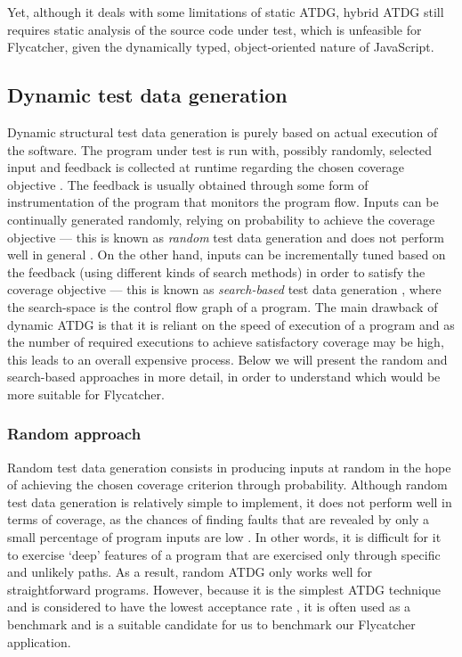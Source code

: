 \documentclass[a4paper,11pt,titlepage]{report}
\begin{document}
Yet, although it deals with some limitations of static ATDG, hybrid ATDG still requires static analysis of the source code under test, which is unfeasible for \textsf{Flycatcher}, given the dynamically typed, object-oriented nature of JavaScript.

\subsection{Dynamic test data generation}

Dynamic structural test data generation is purely based on actual execution of the software. The program under test is run with, possibly randomly, selected input and feedback is collected at runtime regarding the chosen coverage objective \cite{edvardsson1999survey}. The feedback is usually obtained through some form of instrumentation of the program that monitors the program flow. Inputs can be continually generated randomly, relying on probability to achieve the coverage objective --- this is known as \emph{random} test data generation and does not perform well in general \cite{edvardsson1999survey}. On the other hand, inputs can be incrementally tuned based on the feedback (using different kinds of search methods) in order to satisfy the coverage objective --- this is known as \emph{search-based} test data generation \cite{mcminn2004search}, where the search-space is the control flow graph of a program. The main drawback of dynamic ATDG is that it is reliant on the speed of execution of a program and as the number of required executions to achieve satisfactory coverage may be high, this leads to an overall expensive process. Below we will present the random and search-based approaches in more detail, in order to understand which would be more suitable for \textsf{Flycatcher}.

\subsubsection{Random approach}

Random test data generation consists in producing inputs at random in the hope of achieving the chosen coverage criterion through probability. Although random test data generation is relatively simple to implement, it does not perform well in terms of coverage, as the chances of finding faults that are revealed by only a small percentage of program inputs are low \cite{edvardsson1999survey}. In other words, it is difficult for it to exercise `deep' features of a program that are exercised only through specific and unlikely paths. As a result, random ATDG only works well for straightforward programs. However, because it is the simplest ATDG technique and is considered to have the lowest acceptance rate \cite{edvardsson1999survey}, it is often used as a benchmark and is a suitable candidate for us to benchmark our \textsf{Flycatcher} application.
\end{document}
